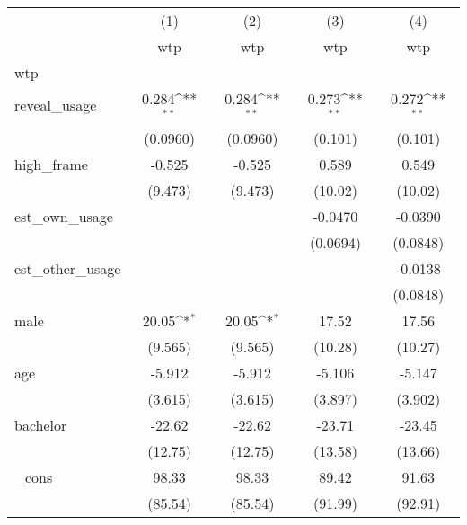 {
\def\sym#1{\ifmmode^{#1}\else\(^{#1}\)\fi}
\begin{tabular}{l*{4}{c}}
\hline\hline
          &\multicolumn{1}{c}{(1)}&\multicolumn{1}{c}{(2)}&\multicolumn{1}{c}{(3)}&\multicolumn{1}{c}{(4)}\\
          &\multicolumn{1}{c}{wtp}&\multicolumn{1}{c}{wtp}&\multicolumn{1}{c}{wtp}&\multicolumn{1}{c}{wtp}\\
\hline
wtp       &                  &                  &                  &                  \\
reveal\_usage&    0.284\sym{**} &    0.284\sym{**} &    0.273\sym{**} &    0.272\sym{**} \\
          & (0.0960)         & (0.0960)         &  (0.101)         &  (0.101)         \\
[1em]
high\_frame&   -0.525         &   -0.525         &    0.589         &    0.549         \\
          &  (9.473)         &  (9.473)         &  (10.02)         &  (10.02)         \\
[1em]
est\_own\_usage&                  &                  &  -0.0470         &  -0.0390         \\
          &                  &                  & (0.0694)         & (0.0848)         \\
[1em]
est\_other\_usage&                  &                  &                  &  -0.0138         \\
          &                  &                  &                  & (0.0848)         \\
[1em]
male      &    20.05\sym{*}  &    20.05\sym{*}  &    17.52         &    17.56         \\
          &  (9.565)         &  (9.565)         &  (10.28)         &  (10.27)         \\
[1em]
age       &   -5.912         &   -5.912         &   -5.106         &   -5.147         \\
          &  (3.615)         &  (3.615)         &  (3.897)         &  (3.902)         \\
[1em]
bachelor  &   -22.62         &   -22.62         &   -23.71         &   -23.45         \\
          &  (12.75)         &  (12.75)         &  (13.58)         &  (13.66)         \\
[1em]
\_cons    &    98.33         &    98.33         &    89.42         &    91.63         \\
          &  (85.54)         &  (85.54)         &  (91.99)         &  (92.91)         \\

\end{tabular}}
